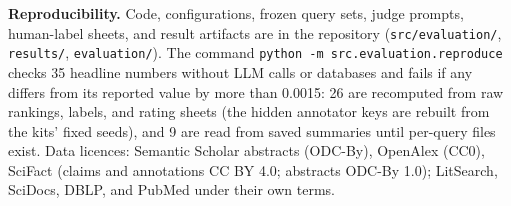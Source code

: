 \documentclass[conference]{IEEEtran}
\begin{document}
\textbf{Reproducibility.} Code, configurations, frozen query sets, judge prompts, human-label sheets, and result artifacts are in the repository (\texttt{src/evaluation/}, \texttt{results/}, \texttt{evaluation/}). The command \texttt{python -m src.evaluation.reproduce} checks 35 headline numbers without LLM calls or databases and fails if any differs from its reported value by more than 0.0015: 26 are recomputed from raw rankings, labels, and rating sheets (the hidden annotator keys are rebuilt from the kits' fixed seeds), and 9 are read from saved summaries until per-query files exist. Data licences: Semantic Scholar abstracts (ODC-By), OpenAlex (CC0), SciFact (claims and annotations CC BY 4.0; abstracts ODC-By 1.0); LitSearch, SciDocs, DBLP, and PubMed under their own terms.



\end{document}
